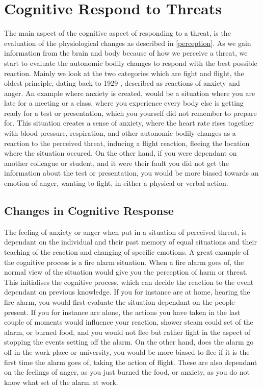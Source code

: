 \section{Cognitive Respond to Threats}
The main aspect of the cognitive aspect of responding to a threat, is the evaluation of the physiological changes as described in \ref{perception}. As we gain information from the brain and body because of how we perceive a threat, we start to evaluate the autonomic bodily changes to respond with the best possible reaction. Mainly we look at the two categories which are fight and flight, the oldest principle, dating back to 1929 \cite{bodily_changes}, described as reactions of anxiety and anger. An example where anxiety is created, would be a situation where you are late for a meeting or a class, where you experience every body else is getting ready for a test or presentation, which you yourself did not remember to prepare for. This situation creates a sense of anxiety, where the heart rate rises together with blood pressure, respiration, and other autonomic bodily changes as a reaction to the perceived threat, inducing a flight reaction, fleeing the location where the situation occured. On the other hand, if you were dependant on another colleague or student, and it were their fault you did not get the information about the test or presentation, you would be more biased towards an emotion of anger, wanting to fight, in either a physical or verbal action. \cite{bodily_changes}

\subsection{Changes in Cognitive Response}\label{cognitive_response}
The feeling of anxiety or anger when put in a situation of perceived threat, is dependant on the individual and their past memory of equal situations and their teaching of the reaction and changing of specific emotions. A great example of the cognitive process is a fire alarm situation. When a fire alarm goes of, the normal view of the situation would give you the 
perception of harm or threat. This initialises the cognitive process, which can decide the reaction to the event dependant on previous knowledge. If you for instance are at home, hearing the fire alarm, you would first evaluate the situation dependant on the people present. If you for instance are alone, the actions you have taken in the last couple of moments would influence your reaction, shower steam could set of the alarm, or burned food, and you would not flee but rather fight in the aspect of stopping the events setting off the alarm. On the other hand, does the alarm go off in the work place or university, you would be more biased to flee if it is the first time the alarm goes of, taking the action of flight. These are also dependant on the feelings of anger, as you just burned the food, or anxiety, as you do not know what set of the alarm at work.\cite{bodily_changes}

